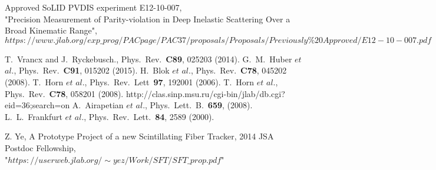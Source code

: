 \begin{thebibliography}{}
  Approved SoLID PVDIS experiment E12-10-007,\\
  "Precision Measurement of Parity-violation in Deep Inelastic Scattering Over a Broad Kinematic Range",\\
  $https://www.jlab.org/exp\_prog/PACpage/PAC37/proposals/Proposals/Previously\%20Approved/E12-10-007.pdf$


	        T.~Vrancx and J.~Ryckebusch., Phys.~Rev.~\textbf{C89}, 025203 (2014).
	G.~M.~Huber $\textit{et}$ $\textit{al}$., Phys.~Rev.~\textbf{C91}, 015202 (2015).
	H.~Blok $\textit{et}$ $\textit{al}$., Phys.~Rev.~\textbf{C78}, 045202 (2008).
	T.~Horn $\textit{et}$ $\textit{al}$., Phys.~Rev.~Lett~\textbf{97}, 192001 (2006).
	T.~Horn $\textit{et}$ $\textit{al}$., Phys.~Rev.~\textbf{C78}, 058201 (2008).
	        http://clas.sinp.msu.ru/cgi-bin/jlab/db.cgi?eid=36;search=on
	A.~Airapetian $\textit{et}$ $\textit{al}$., Phys.~Lett.~B.~\textbf{659}, (2008).
	L.~L.~Frankfurt $\textit{et}$ $\textit{al}$., Phys.~Rev.~Lett.~\textbf{84}, 2589 (2000).


 Z. Ye, A Prototype Project of a new Scintillating Fiber Tracker, 2014 JSA Postdoc Fellowship,\\ "$https://userweb.jlab.org/\sim yez/Work/SFT/SFT\_prop.pdf$"
\end{thebibliography}
